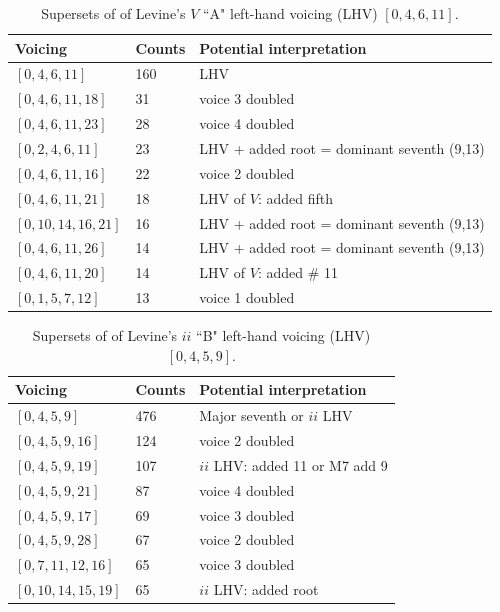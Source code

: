 \begin{table}%
  \caption{Supersets of of Levine's $V$ ``A" left-hand voicing (LHV) $[0,4,6,11]$.}
  \centering
\begin{tabular}{l| l | l}
\hline\hline
Voicing & Counts & Potential interpretation \\ [0.5ex]
\hline
$[0,4,6,11]$ & 160 & LHV \\
$[0,4,6,11,18]$ & 31 & voice 3 doubled \\
$[0,4,6,11,23]$ & 28 & voice 4 doubled \\
$[0,2,4,6,11]$ & 23 & LHV + added root = dominant seventh (9,13) \\
$[0,4,6,11,16]$ & 22 & voice 2 doubled \\
$[0,4,6,11,21]$ & 18 & LHV of $V$: added fifth \\
$[0,10,14,16,21]$ & 16 & LHV + added root = dominant seventh (9,13) \\
$[0,4,6,11,26]$ & 14 & LHV + added root = dominant seventh (9,13) \\
$[0,4,6,11,20]$ & 14 & LHV of $V$: added \# 11 \\
$[0,1,5,7,12]$ & 13 & voice 1 doubled \\[1ex]
\hline
\end{tabular}
\label{a_V_lhv}
\end{table}

\begin{table}%
  \caption{Supersets of of Levine's $ii$ ``B" left-hand voicing (LHV) $[0,4,5,9]$.}
  \centering
\begin{tabular}{l| l | l}
\hline\hline
Voicing & Counts & Potential interpretation \\ [0.5ex]
\hline
$[0,4,5,9]$ & 476 & Major seventh or $ii$ LHV \\
$[0,4,5,9,16]$ & 124 & voice 2 doubled \\
$[0,4,5,9,19]$ & 107 & $ii$ LHV: added 11 or M7 add 9 \\
$[0,4,5,9,21]$ & 87 & voice 4 doubled \\
$[0,4,5,9,17]$ & 69 & voice 3 doubled \\
$[0,4,5,9,28]$ & 67 & voice 2 doubled \\
$[0,7,11,12,16]$ & 65 & voice 3 doubled \\
$[0,10,14,15,19]$ & 65 & $ii$ LHV: added root \\[1ex]
\hline
\end{tabular}
\label{b_ii_lhv}
\end{table}

